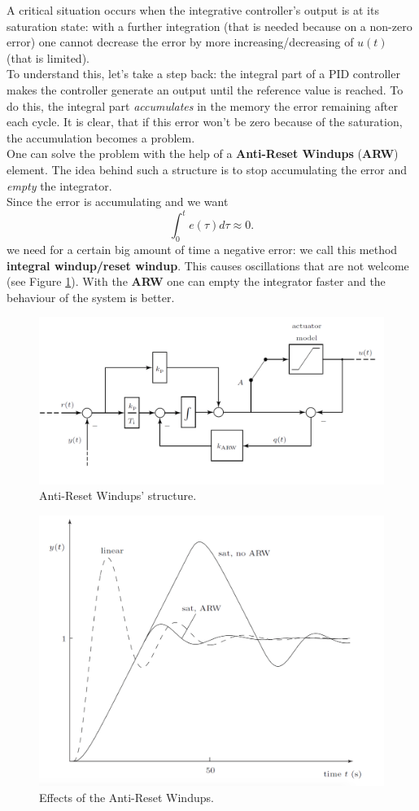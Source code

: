 \documentclass[a4paper,12 pt]{article}
\numberwithin{equation}{section}
\theoremstyle{definition}
\theoremstyle{remark}
\theoremstyle{definition}
\theoremstyle{definition}
\theoremstyle{definition}
\theoremstyle{remark}
\begin{document}
A critical situation occurs when the integrative controller's output is at its saturation state: with a further integration (that is needed because on a non-zero error) one cannot decrease the error by more increasing/decreasing of $u(t)$ (that is limited). \\ 
To understand this, let's take a step back: the integral part of a PID controller makes the controller generate an output until the reference value is reached. To do this, the integral part \textit{accumulates} in the memory the error remaining after each cycle. It is clear, that if this error won't be zero because of the saturation, the accumulation becomes a problem. \\
One can solve the problem with the help of a \textbf{Anti-Reset Windups} (\textbf{ARW}) element. The idea behind such a structure is to stop accumulating the error and \textit{empty} the integrator. \\Since the error is accumulating and we want
\begin{equation}
\int_0^t e(\tau) d\tau \approx 0.
\end{equation}
we need for a certain big amount of time a negative error: we call this method \textbf{integral windup/reset windup}. This causes oscillations that are not welcome (see Figure \ref{fig:osc}). With the \textbf{ARW} one can empty the integrator faster and the behaviour of the system is better.
\begin{figure}[H]
\begin{center}
\includegraphics[width=0.8\columnwidth]{arw1}
\end{center}
\caption{Anti-Reset Windups' structure.}
\end{figure}


\begin{figure}[H]
\begin{center}
\includegraphics[width=0.6\columnwidth]{arw2}
\end{center}
\caption{Effects of the Anti-Reset Windups.}
\label{fig:osc}
\end{figure}
\newpage
\end{document}
